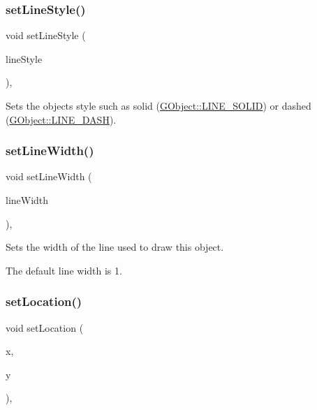 \subsubsection{\texorpdfstring{set\+Line\+Style()}{setLineStyle()}}
{\footnotesize\ttfamily void set\+Line\+Style (\begin{DoxyParamCaption}\item[{\mbox{\hyperlink{classsgl_1_1GObject_a86e0f5648542856159bb40775c854aa7}{G\+Object\+::\+Line\+Style}}}]{line\+Style }\end{DoxyParamCaption})\hspace{0.3cm}{\ttfamily [virtual]}, {\ttfamily [inherited]}}



Sets the object\textquotesingle{}s style such as solid (\mbox{\hyperlink{classsgl_1_1GObject_a86e0f5648542856159bb40775c854aa7a700c78bc2cd76acaab26651bf7b4941f}{G\+Object\+::\+L\+I\+N\+E\+\_\+\+S\+O\+L\+ID}}) or dashed (\mbox{\hyperlink{classsgl_1_1GObject_a86e0f5648542856159bb40775c854aa7a9ccba0845f785d81d07b333ae1aad84e}{G\+Object\+::\+L\+I\+N\+E\+\_\+\+D\+A\+SH}}). 

\mbox{\label{classsgl_1_1GObject_afd6a47c6ea6a1f85ca05a65ba3ff3477}} 
\subsubsection{\texorpdfstring{set\+Line\+Width()}{setLineWidth()}}
{\footnotesize\ttfamily void set\+Line\+Width (\begin{DoxyParamCaption}\item[{double}]{line\+Width }\end{DoxyParamCaption})\hspace{0.3cm}{\ttfamily [virtual]}, {\ttfamily [inherited]}}



Sets the width of the line used to draw this object. 

The default line width is 1. \mbox{\label{classsgl_1_1GObject_a04594e8ba9b98513a64f1da00dcae18c}} 
\subsubsection{\texorpdfstring{set\+Location()}{setLocation()}\hspace{0.1cm}{\footnotesize\ttfamily [1/2]}}
{\footnotesize\ttfamily void set\+Location (\begin{DoxyParamCaption}\item[{double}]{x,  }\item[{double}]{y }\end{DoxyParamCaption})\hspace{0.3cm}{\ttfamily [virtual]}, {\ttfamily [inherited]}}



